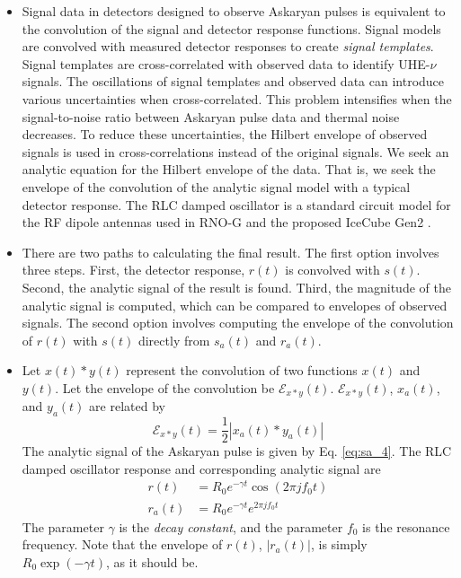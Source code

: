 \documentclass[amsmath,amssymb,aps,prd,10pt,twocolumn,showkeys]{revtex4}
\begin{document}
\begin{itemize}
\item Signal data in detectors designed to observe Askaryan pulses is equivalent to the convolution of the signal and detector response functions.  Signal models are convolved with measured detector responses to create \textit{signal templates}.  Signal templates are cross-correlated with observed data to identify UHE-$\nu$ signals.  The oscillations of signal templates and observed data can introduce various uncertainties when cross-correlated.  This problem intensifies when the signal-to-noise ratio between Askaryan pulse data and thermal noise decreases.  To reduce these uncertainties, the Hilbert envelope of observed signals is used in cross-correlations instead of the original signals.  We seek an analytic equation for the Hilbert envelope of the data.  That is, we seek the envelope of the convolution of the analytic signal model with a typical detector response.  The RLC damped oscillator is a standard circuit model for the RF dipole antennas used in RNO-G and the proposed IceCube Gen2 \cite{10.1103/PhysRevD.85.062004,10.1088/1748-0221/16/03/p03025,10.48550/arxiv.2008.04323}.
\item There are two paths to calculating the final result.  The first option involves three steps.  First, the detector response, $r(t)$ is convolved with $s(t)$.  Second, the analytic signal of the result is found.  Third, the magnitude of the analytic signal is computed, which can be compared to envelopes of observed signals.  The second option involves computing the envelope of the convolution of $r(t)$ with $s(t)$ directly from $s_a(t)$ and $r_a(t)$.
\item Let $x(t) * y(t)$ represent the convolution of two functions $x(t)$ and $y(t)$.  Let the envelope of the convolution be $\mathcal{E}_{x * y}(t)$.  $\mathcal{E}_{x * y}(t)$, $x_a(t)$, and $y_a(t)$ are related by
\begin{equation}
\mathcal{E}_{x * y}(t) = \frac{1}{2}| x_a (t) * y_a(t)| \label{eq:awesome}
\end{equation}
The analytic signal of the Askaryan pulse is given by Eq. \ref{eq:sa_4}.  The RLC damped oscillator response and corresponding analytic signal are
\begin{align}
r(t) &= R_0 e^{-\gamma t} \cos(2\pi j f_0 t) \\
r_a(t) &= R_0 e^{-\gamma t} e^{2\pi j f_0 t}
\end{align}
The parameter $\gamma$ is the \textit{decay constant}, and the parameter $f_0$ is the resonance frequency.  Note that the envelope of $r(t)$, $|r_a(t)|$, is simply $R_0 \exp(-\gamma t)$, as it should be.

\end{itemize}
\end{document}
